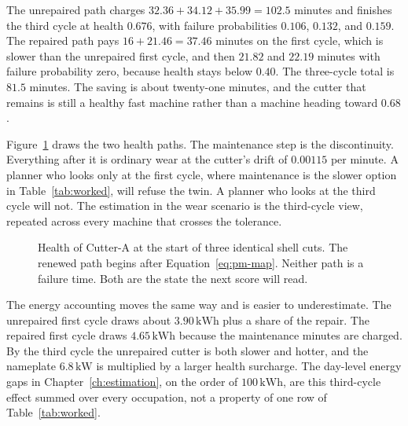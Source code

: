 The unrepaired path charges \(32.36 + 34.12 + 35.99 = 102.5\) minutes and finishes the third cycle at health \(0.676\), with failure probabilities \(0.106\), \(0.132\), and \(0.159\). The repaired path pays \(16 + 21.46 = 37.46\) minutes on the first cycle, which is slower than the unrepaired first cycle, and then \(21.82\) and \(22.19\) minutes with failure probability zero, because health stays below \(0.40\). The three-cycle total is \(81.5\) minutes. The saving is about twenty-one minutes, and the cutter that remains is still a healthy fast machine rather than a machine heading toward \(0.68\).

Figure~\ref{fig:threeh} draws the two health paths. The maintenance step is the discontinuity. Everything after it is ordinary wear at the cutter's drift of \(0.00115\) per minute. A planner who looks only at the first cycle, where maintenance is the slower option in Table~\ref{tab:worked}, will refuse the twin. A planner who looks at the third cycle will not. The estimation in the wear scenario is the third-cycle view, repeated across every machine that crosses the tolerance.

\begin{figure}[ht]
\centering
{}
\caption{Health of Cutter-A at the start of three identical shell cuts. The renewed path begins after Equation~\eqref{eq:pm-map}. Neither path is a failure time. Both are the state the next score will read.}
\label{fig:threeh}
\end{figure}

The energy accounting moves the same way and is easier to underestimate. The unrepaired first cycle draws about \(3.90\,\mathrm{kWh}\) plus a share of the repair. The repaired first cycle draws \(4.65\,\mathrm{kWh}\) because the maintenance minutes are charged. By the third cycle the unrepaired cutter is both slower and hotter, and the nameplate \(6.8\,\mathrm{kW}\) is multiplied by a larger health surcharge. The day-level energy gaps in Chapter~\ref{ch:estimation}, on the order of \(100\,\mathrm{kWh}\), are this third-cycle effect summed over every occupation, not a property of one row of Table~\ref{tab:worked}.

